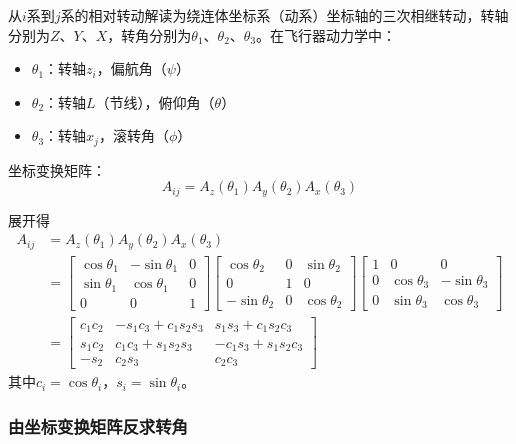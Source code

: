 从$i$系到$j$系的相对转动解读为绕连体坐标系（动系）坐标轴的三次相继转动，转轴分别为$Z$、$Y$、$X$，转角分别为$\theta_1$、$\theta_2$、$\theta_3$。在飞行器动力学中：
\begin{itemize}
\item $\theta_1$：转轴$z_i$，偏航角（$\psi$）
\item $\theta_2$：转轴$L$（节线），俯仰角（$\theta$）
\item $\theta_3$：转轴$x_j$，滚转角（$\phi$）
\end{itemize}

坐标变换矩阵：
\begin{equation}
A_{ij} = A_z(\theta_1)A_y(\theta_2)A_x(\theta_3)
\end{equation}

展开得
\begin{align}
A_{ij} &= A_z(\theta_1)A_y(\theta_2)A_x(\theta_3) \nonumber\\
&= \begin{bmatrix}
\cos\theta_1 & -\sin\theta_1 & 0 \\
\sin\theta_1 & \cos\theta_1  & 0 \\
0            & 0            & 1
\end{bmatrix}
\begin{bmatrix}
\cos\theta_2  & 0 & \sin\theta_2  \\
0            & 1 & 0             \\
-\sin\theta_2 & 0 & \cos\theta_2
\end{bmatrix}
\begin{bmatrix}
1 & 0            & 0             \\
0 & \cos\theta_3 & -\sin\theta_3  \\
0 & \sin\theta_3 & \cos\theta_3
\end{bmatrix} \nonumber\\
&= \begin{bmatrix}
c_1c_2  & -s_1c_3 + c_1s_2s_3  & s_1s_3 + c_1s_2c_3  \\[3pt]
s_1c_2  & c_1c_3 + s_1s_2s_3   & -c_1s_3 + s_1s_2c_3 \\[3pt]
-s_2    & c_2s_3               & c_2c_3
\end{bmatrix}
\label{eq:7.15}
\end{align}
其中$c_i = \cos\theta_i$，$s_i = \sin\theta_i$。

\subsubsection*{由坐标变换矩阵反求转角}

